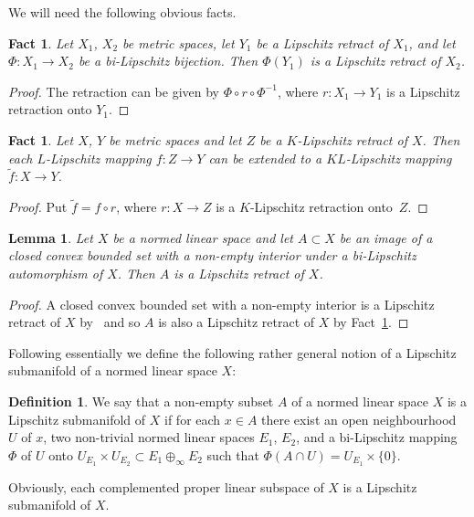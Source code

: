 \documentclass[a4paper,twoside,10pt,reqno,draft]{amsart}
\let\comp=\circ
\newtheorem{lemma}[theorem]{Lemma}
\newtheorem{fact}[theorem]{Fact}
\theoremstyle{definition}
\newtheorem{definition}[theorem]{Definition}
\theoremstyle{remark}
\begin{document}
We will need the following obvious facts.

\begin{fact}\label{f:retract-bilip}
Let $X_1$, $X_2$ be metric spaces, let $Y_1$ be a Lipschitz retract of $X_1$, and let $\Phi\colon X_1\to X_2$ be a bi-Lipschitz bijection.
Then $\Phi(Y_1)$ is a Lipschitz retract of $X_2$.
\end{fact}
\begin{proof}
The retraction can be given by $\Phi\comp r\comp\Phi^{-1}$, where $r\colon X_1\to Y_1$ is a Lipschitz retraction onto $Y_1$.
\end{proof}

\begin{fact}\label{f:retr-ext}
Let $X$, $Y$ be metric spaces and let $Z$ be a $K$-Lipschitz retract of $X$.
Then each $L$-Lipschitz mapping $f\colon Z\to Y$ can be extended to a $KL$-Lipschitz mapping $\tilde f\colon X\to Y$.
\end{fact}
\begin{proof}
Put $\tilde f=f\comp r$, where $r\colon X\to Z$ is a $K$-Lipschitz retraction onto~$Z$.
\end{proof}

\begin{lemma}\label{l:convex-retract}
Let $X$ be a normed linear space and let $A\subset X$ be an image of a closed convex bounded set with a non-empty interior under a bi-Lipschitz automorphism of $X$.
Then $A$ is a Lipschitz retract of $X$.
\end{lemma}
\begin{proof}
A closed convex bounded set with a non-empty interior is a Lipschitz retract of $X$ by~\cite{F} and so $A$ is also a Lipschitz retract of $X$ by Fact~\ref{f:retract-bilip}.
\end{proof}

\medskip
Following essentially \cite[Definitions~2,~3]{Pe} we define the following rather general notion of a Lipschitz submanifold of a normed linear space $X$:
\begin{definition}\label{d:lip_subman}
We say that a non-empty subset $A$ of a normed linear space $X$ is a Lipschitz submanifold of $X$ if
for each $x\in A$ there exist an open neighbourhood $U$ of $x$, two non-trivial normed linear spaces $E_1$, $E_2$,
and a bi-Lipschitz mapping $\Phi$ of $U$ onto $U_{E_1}\times U_{E_2}\subset E_1\oplus_\infty E_2$ such that $\Phi(A\cap U)=U_{E_1}\times\{0\}$.
\end{definition}
Obviously, each complemented proper linear subspace of $X$ is a Lipschitz submanifold of $X$.
\end{document}
